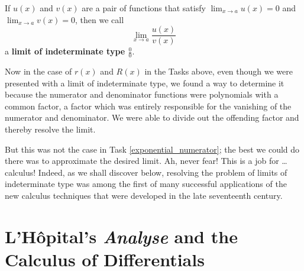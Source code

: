 \documentclass[11pt]{article}
\newcounter{tasknumb}
\newcommand{\tasknumb}[1]{\refstepcounter{tasknumb}\textmd{\textbf{$\fbox{$\fbox{Task \thetasknumb}$}$}}#1}
\begin{document}
If $u(x)$ and $v(x)$ are a pair of functions that satisfy ${\displaystyle \lim_{x\to a}} u(x)=0$ and ${\displaystyle \lim_{x\to a}} v(x)=0$, then we call 
\begin{equation}\label{indeterminate}
\lim_{x\to a} \frac{u(x)}{v(x)}
\end{equation}
 a {\bf limit of indeterminate type $\frac00$}.

Now in the case of $r(x)$ and $R(x)$ in the Tasks above, even though we were presented with a limit of indeterminate type, we found a way to determine it because the numerator and denominator functions were polynomials with a common factor, a factor which was entirely responsible for the vanishing of the numerator and denominator. We were able to divide out the offending factor and thereby resolve the limit. 

But this was not the case in Task \ref{exponential_numerator}; the best we could do there was to approximate the desired limit. Ah, never fear! This is a job for \dots calculus! Indeed, as we shall discover below, resolving the problem of limits of indeterminate type was among the first of many successful applications of the new calculus techniques that were developed in the late seventeenth century.
\bigskip

\section{L'H\^opital's \emph{Analyse} and the Calculus of Differentials}
\end{document}
